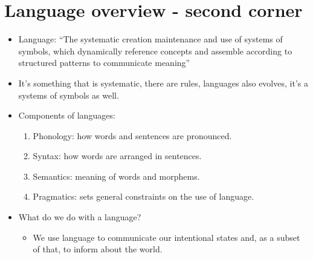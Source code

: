 \section{Language overview - second corner}
\begin{itemize}
    \item Language: ``The systematic creation maintenance and use of systems of symbols, which dynamically reference concepts and assemble according to structured patterns to communicate meaning''
    \item It's something that is systematic, there are rules, languages also evolves, it's a systems of symbols as well.
    \item Components of languages:
        \begin{enumerate}
            \item Phonology: how words and sentences are pronounced.
            \item Syntax: how words are arranged in sentences.
            \item Semantics: meaning of words and morphems.
            \item Pragmatics: sets general constraints on the use of language.
        \end{enumerate}
    
    \item What do we do with a language? 
        \begin{itemize}
            \item We use language to communicate our intentional states and, as a subset of that, to inform about the world.
        \end{itemize}
\end{itemize}



